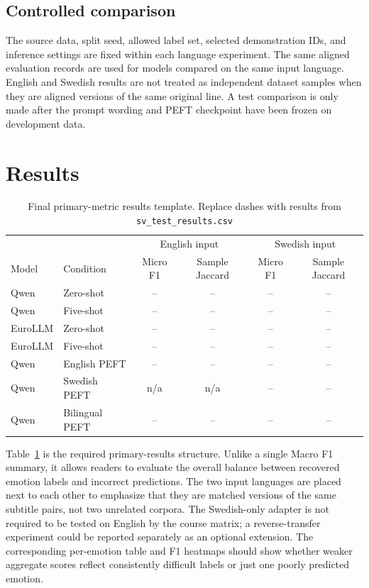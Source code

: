 \documentclass[11pt,a4paper]{article}
\begin{document}
\subsection{Controlled comparison}
The source data, split seed, allowed label set, selected demonstration IDs, and inference settings are fixed within each language experiment. The same aligned evaluation records are used for models compared on the same input language. English and Swedish results are not treated as independent dataset samples when they are aligned versions of the same original line. A test comparison is only made after the prompt wording and PEFT checkpoint have been frozen on development data.

\section{Results}
\begin{table}[H]
\centering\small
\caption{Final primary-metric results template. Replace dashes with results from \texttt{sv\_test\_results.csv}}
\label{tab:primary}
\begin{tabular}{llcccc}
\toprule
& & \multicolumn{2}{c}{English input} & \multicolumn{2}{c}{Swedish input} \\
Model & Condition & Micro F1 & Sample Jaccard & Micro F1 & Sample Jaccard \\
\midrule
Qwen & Zero-shot & -- & -- & -- & -- \\
Qwen & Five-shot & -- & -- & -- & -- \\
EuroLLM & Zero-shot & -- & -- & -- & -- \\
EuroLLM & Five-shot & -- & -- & -- & -- \\
Qwen & English PEFT & -- & -- & -- & -- \\
Qwen & Swedish PEFT & n/a & n/a & -- & -- \\
Qwen & Bilingual PEFT & -- & -- & -- & -- \\
\bottomrule
\end{tabular}
\end{table}

Table~\ref{tab:primary} is the required primary-results structure. Unlike a single Macro F1 summary, it allows readers to evaluate the overall balance between recovered emotion labels and incorrect predictions. The two input languages are placed next to each other to emphasize that they are matched versions of the same subtitle pairs, not two unrelated corpora. The Swedish-only adapter is not required to be tested on English by the course matrix; a reverse-transfer experiment could be reported separately as an optional extension. The corresponding per-emotion table and F1 heatmaps should show whether weaker aggregate scores reflect consistently difficult labels or just one poorly predicted emotion.
\end{document}
